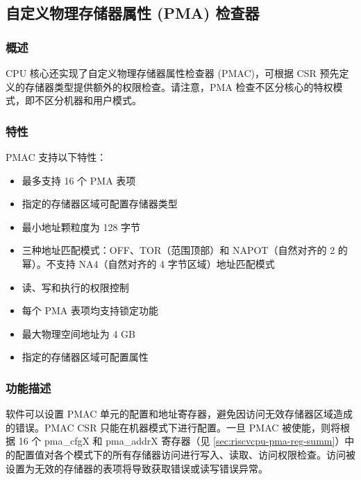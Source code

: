 \documentclass[main\_\_CN.tex]{subfiles}
\begin{document}



\newpage
\subsection{自定义物理存储器属性 (PMA) 检查器}
\label{sec:riscvcpu-pma}
\subsubsection{概述}
\label{sec:riscvcpu-pma-overview}
CPU 核心还实现了自定义物理存储器属性检查器 (PMAC)，可根据 CSR 预先定义的存储器类型提供额外的权限检查。请注意，PMA 检查不区分核心的特权模式，即不区分机器和用户模式。


\subsubsection{特性}
\label{sec:riscvcpu-pma-features}

PMAC 支持以下特性：

\begin{itemize}
    \item 最多支持 16 个 PMA 表项
    \item 指定的存储器区域可配置存储器类型
    \item 最小地址颗粒度为 128 字节
    \item 三种地址匹配模式：OFF、TOR（范围顶部）和 NAPOT（自然对齐的 2 的幂）。不支持 NA4（自然对齐的 4 字节区域）地址匹配模式
    \item 读、写和执行的权限控制
    \item 每个 PMA 表项均支持锁定功能
    \item 最大物理空间地址为 4 GB
    \item 指定的存储器区域可配置属性
\end{itemize}

\subsubsection{功能描述}
\label{sec:riscvcpu-pma-func-descr}

软件可以设置 PMAC 单元的配置和地址寄存器，避免因访问无效存储器区域造成的错误。PMAC CSR 只能在机器模式下进行配置。一旦 PMAC 被使能，则将根据 16 个 pma\_cfgX 和 pma\_addrX 寄存器（见 \ref{sec:riscvcpu-pma-reg-summ}）中的配置值对各个模式下的所有存储器访问进行写入、读取、访问权限检查。访问被设置为无效的存储器的表项将导致获取错误或读写错误异常。
\end{document}
